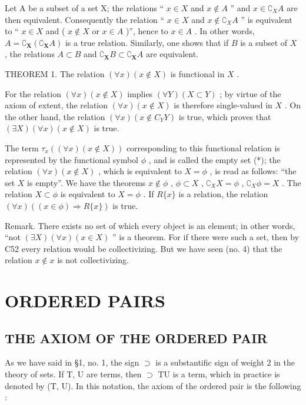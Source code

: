 Let A be a subset of a set X; the relations `` \(x \in X\) and \(x \notin A\) '' and \(x \in \complement_{X} A\) are then equivalent. Consequently the relation `` \(x \in X\) and \(x \notin \complement_{X} A\) '' is equivalent to `` \(x \in X\) and ( \(x \notin X\) or \(x \in A\) )'', hence to \(x \in A\) . In other words, \(A = \complement_{\mathbf{X}}(\complement_{\mathbf{X}} A)\) is a true relation. Similarly, one shows that if \(B\) is a subset of \(X\) , the relations \(A \subset B\) and \(\complement_{\mathbf{X}} B \subset \complement_{\mathbf{X}} A\) are equivalent.

THEOREM 1. The relation \((\forall x)(x \notin X)\) is functional in \(X\) .

For the relation \((\forall x)(x \notin X)\) implies \((\forall Y)(X \subset Y)\) ; by virtue of the axiom of extent, the relation \((\forall x)(x \notin X)\) is therefore single-valued in \(X\) . On the other hand, the relation \((\forall x)(x \notin C_{Y}Y)\) is true, which proves that \((\exists X)(\forall x)(x \notin X)\) is true.

The term \(\tau_x((\forall x)(x \notin X))\) corresponding to this functional relation is represented by the functional symbol \(\phi\) , and is called the empty set (*); the relation \((\forall x)(x \notin X)\) , which is equivalent to \(X = \phi\) , is read as follows: ``the set \(X\) is empty''. We have the theorems \(x \notin \phi\) , \(\phi \subset X\) , \(\complement_X X = \phi\) , \(\complement_X \phi = X\) . The relation \(X \subset \phi\) is equivalent to \(X = \phi\) . If \(R \{x\}\) is a relation, the relation \((\forall x)((x \in \phi) \Longrightarrow R \{x\})\) is true.

Remark. There exists no set of which every object is an element; in other words, ``not \((\exists X)(\forall x)(x \in X)\) '' is a theorem. For if there were such a set, then by C52 every relation would be collectivizing. But we have seen (no. 4) that the relation \(x \notin x\) is not collectivizing.

\section{ORDERED PAIRS}

\subsection{THE AXIOM OF THE ORDERED PAIR}

As we have said in §1, no. 1, the sign \(\supset\) is a substantific sign of weight 2 in the theory of sets. If T, U are terms, then \(\supset\) TU is a term, which in practice is denoted by (T, U). In this notation, the axiom of the ordered pair is the following :

